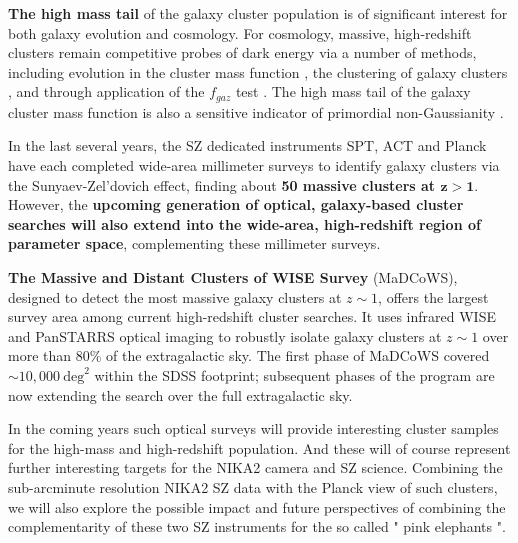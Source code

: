 \documentclass[11pt,a4paper,twoside,graphicx,color]{article}
\begin{document}
\textbf{The high mass tail} of the galaxy cluster population is of significant interest for both galaxy evolution and cosmology. For cosmology, massive, high-redshift clusters remain competitive probes of dark energy via a number of methods, including evolution in the cluster mass function \cite{vik09}, the clustering of galaxy clusters \cite{ser15}, and through application of the $f_{gaz}$ test \cite{man14}. The high mass tail of the galaxy cluster mass function is also a sensitive indicator of primordial non-Gaussianity \cite{sha13}.

In the last several years, the SZ dedicated instruments SPT, ACT and Planck have each completed wide-area millimeter surveys to identify galaxy clusters via the Sunyaev-Zel’dovich effect, finding about \textbf{50 massive clusters at $\mathbf{z > 1}$}. However, the \textbf{upcoming generation of optical, galaxy-based cluster searches will also extend into the wide-area, high-redshift region of parameter space}, complementing these millimeter surveys. 

\textbf{The Massive and Distant Clusters of WISE Survey} (MaDCoWS), designed to detect the most massive galaxy clusters at $z \sim 1$, offers the largest survey area among current high-redshift cluster searches. It uses infrared WISE and PanSTARRS optical imaging to robustly isolate galaxy clusters at $z \sim 1$ over more than 80\% of the extragalactic sky. The first phase of MaDCoWS
covered $\sim 10,000~\mathrm{deg}^2$ within the SDSS footprint; subsequent phases of the program are now extending the search over the full extragalactic sky.

In the coming years such optical surveys will provide interesting cluster samples for the high-mass and high-redshift population. And these will of course represent further interesting targets for the NIKA2 camera and SZ science. Combining the sub-arcminute resolution NIKA2 SZ data with the Planck view of such clusters, we will also explore the possible impact and future perspectives of combining the complementarity of these two SZ instruments for the so called " pink elephants ".
\end{document}
